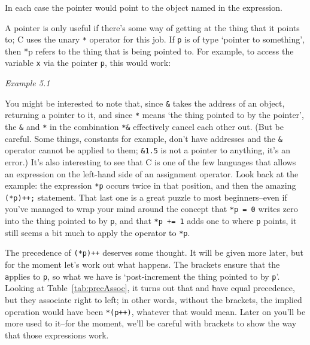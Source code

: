    In each case the pointer would point to the object named in the
    expression.


   A pointer is only useful if there's some way of getting at the thing
    that it points to; C uses the unary \texttt{*} operator for this
    job.  If \texttt{p} is of type `pointer to something', then *p
    refers to the thing that is being pointed to. For example, to access the
    variable \texttt{x} via the pointer \texttt{p}, this would
    work:


    \begin{center}\textit{Example 5.1}\end{center}


   You might be interested to note that, since \texttt{\&} takes
    the address of an object, returning a pointer to it, and since
    \texttt{*} means `the thing pointed to by the pointer', the
    \texttt{\&} and \texttt{*} in the combination
    \texttt{*\&} effectively cancel each other out. (But be careful.
    Some things, constants for example, don't have addresses and the
    \texttt{\&} operator cannot be applied to them;
    \texttt{\&1.5} is not a pointer to anything, it's an error.) It's
    also interesting to see that C is one of the few languages that allows
    an expression on the left-hand side of an assignment operator. Look back
    at the example: the expression \texttt{*p} occurs twice in that
    position, and then the amazing \texttt{(*p)++;} statement. That last
    one is a great puzzle to most beginners--even if you've managed to
    wrap your mind around the concept that \texttt{*p = 0} writes zero
    into the thing pointed to by \texttt{p}, and that \texttt{*p +=
    1} adds one to where \texttt{p} points, it still seems a bit
    much to apply the \pp{} operator to \texttt{*p}.


   The precedence of \texttt{(*p)++} deserves some thought. It will
    be given more later, but for the moment let's work out what happens. The
    brackets ensure that the \texttt * applies to \texttt p,
    so what we have is `post-increment the thing pointed to by \texttt p'.
    Looking at Table~\ref{tab:precAssoc},
    it turns out that \pp{} and \texttt * have equal precedence,
    but they
    associate right to left; in other words, without the brackets, the
    implied operation would have been \texttt{*(p++)},
    whatever that would mean.
    Later on you'll be more used to it--for the moment, we'll be careful
    with brackets to show the way that those expressions work.


